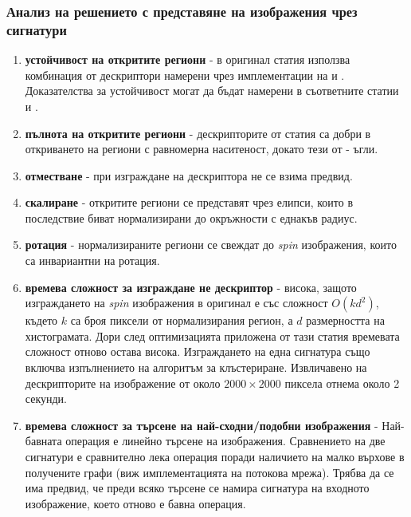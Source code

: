 \documentclass[a4paper,12pt]{article}
\begin{document}
\subsubsection{Анализ на решението с представяне на изображения чрез сигнатури}

\begin{enumerate}
    \item \textbf{устойчивост на откритите региони} - в оригинал статия \cite{spinimages} използва комбинация от дескриптори намерени чрез имплементации на \cite{shapeadaptedsmoothingfor3dcues} и \cite{affineinvariantipdetector}. Доказателства за устойчивост могат да бъдат намерени в съответните статии \cite{shapeadaptedsmoothingfor3dcues} и \cite{affineinvariantipdetector}.
    \item \textbf{пълнота на откритите региони} - дескрипторите от статия \cite{shapeadaptedsmoothingfor3dcues} са добри в откриването на региони с равномерна наситеност, докато тези от \cite{affineinvariantipdetector} - ъгли.
    \item \textbf{отместване} - при изграждане на дескриптора не се взима предвид.
    \item \textbf{скалиране} - откритите региони се представят чрез елипси, които в последствие биват нормализирани до окръжности с еднакъв радиус.
    \item \textbf{ротация} - нормализираните региони се свеждат до \textit{spin} изображения, които са инвариантни на ротация.
    \item \textbf{времева сложност за изграждане не дескриптор} - висока, защото изграждането на \textit{spin} изображения в оригинал е със сложност $O(k d^2)$, където $k$ са броя пиксели от нормализирания регион, а $d$ размерността на хистограмата. Дори след оптимизацията приложена от тази статия времевата сложност отново остава висока. Изграждането на една сигнатура също включва изпълнението на алгоритъм за клъстериране. Извличавено на дескрипторите на изображение от около $2000 \times 2000$ пиксела отнема около 2 секунди.
    \item \textbf{времева сложност за търсене на най-сходни/подобни изображения} - Най-бавната операция е линейно търсене на изображения. Сравнението на две сигнатури е сравнително лека операция поради наличието на малко върхове в получените графи (виж имплементацията на потокова мрежа). Трябва да се има предвид, че преди всяко търсене се намира сигнатура на входното изображение, което отново е бавна операция.
\end{enumerate}
\end{document}
